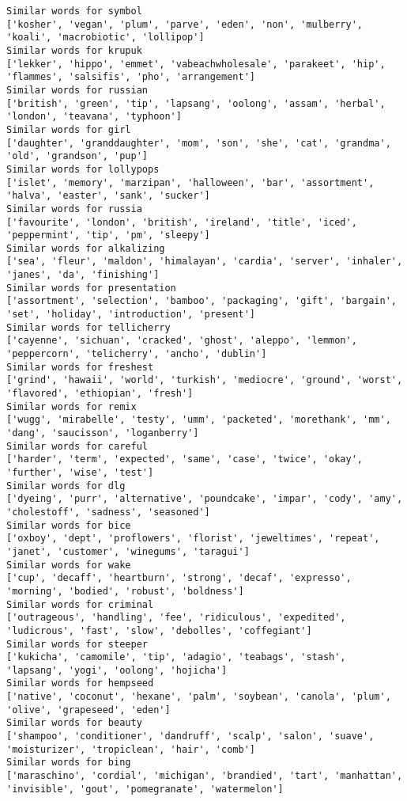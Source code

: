 \documentclass[11pt]{article}
\begin{document}
\begin{Verbatim}[commandchars=\\\{\}]
Similar words for symbol
['kosher', 'vegan', 'plum', 'parve', 'eden', 'non', 'mulberry', 'koali', 'macrobiotic', 'lollipop']
Similar words for krupuk
['lekker', 'hippo', 'emmet', 'vabeachwholesale', 'parakeet', 'hip', 'flammes', 'salsifis', 'pho', 'arrangement']
Similar words for russian
['british', 'green', 'tip', 'lapsang', 'oolong', 'assam', 'herbal', 'london', 'teavana', 'typhoon']
Similar words for girl
['daughter', 'granddaughter', 'mom', 'son', 'she', 'cat', 'grandma', 'old', 'grandson', 'pup']
Similar words for lollypops
['islet', 'memory', 'marzipan', 'halloween', 'bar', 'assortment', 'halva', 'easter', 'sank', 'sucker']
Similar words for russia
['favourite', 'london', 'british', 'ireland', 'title', 'iced', 'peppermint', 'tip', 'pm', 'sleepy']
Similar words for alkalizing
['sea', 'fleur', 'maldon', 'himalayan', 'cardia', 'server', 'inhaler', 'janes', 'da', 'finishing']
Similar words for presentation
['assortment', 'selection', 'bamboo', 'packaging', 'gift', 'bargain', 'set', 'holiday', 'introduction', 'present']
Similar words for tellicherry
['cayenne', 'sichuan', 'cracked', 'ghost', 'aleppo', 'lemmon', 'peppercorn', 'telicherry', 'ancho', 'dublin']
Similar words for freshest
['grind', 'hawaii', 'world', 'turkish', 'mediocre', 'ground', 'worst', 'flavored', 'ethiopian', 'fresh']
Similar words for remix
['wugg', 'mirabelle', 'testy', 'umm', 'packeted', 'morethank', 'mm', 'dang', 'saucisson', 'loganberry']
Similar words for careful
['harder', 'term', 'expected', 'same', 'case', 'twice', 'okay', 'further', 'wise', 'test']
Similar words for dlg
['dyeing', 'purr', 'alternative', 'poundcake', 'impar', 'cody', 'amy', 'cholestoff', 'sadness', 'seasoned']
Similar words for bice
['oxboy', 'dept', 'proflowers', 'florist', 'jeweltimes', 'repeat', 'janet', 'customer', 'winegums', 'taragui']
Similar words for wake
['cup', 'decaff', 'heartburn', 'strong', 'decaf', 'expresso', 'morning', 'bodied', 'robust', 'boldness']
Similar words for criminal
['outrageous', 'handling', 'fee', 'ridiculous', 'expedited', 'ludicrous', 'fast', 'slow', 'debolles', 'coffegiant']
Similar words for steeper
['kukicha', 'camomile', 'tip', 'adagio', 'teabags', 'stash', 'lapsang', 'yogi', 'oolong', 'hojicha']
Similar words for hempseed
['native', 'coconut', 'hexane', 'palm', 'soybean', 'canola', 'plum', 'olive', 'grapeseed', 'eden']
Similar words for beauty
['shampoo', 'conditioner', 'dandruff', 'scalp', 'salon', 'suave', 'moisturizer', 'tropiclean', 'hair', 'comb']
Similar words for bing
['maraschino', 'cordial', 'michigan', 'brandied', 'tart', 'manhattan', 'invisible', 'gout', 'pomegranate', 'watermelon']

\end{Verbatim}
\end{document}
